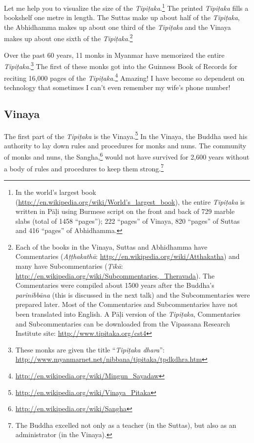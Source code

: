 \pagebreak

Let me help you to visualize the size of the \textit{Tipiṭaka}.\footnote{In the world’s largest book (\url{http://en.wikipedia.org/wiki/World’s_largest_book}), the entire \textit{Tipiṭaka} is written in Pāḷi using Burmese script on the front and back of 729 marble slabs (total of 1458 “pages”); 222 “pages” of Vinaya, 820 “pages” of Suttas and 416 “pages” of Abhidhamma.} The printed \textit{Tipiṭaka} fills a bookshelf one metre in length. The Suttas make up about half of the \textit{Tipiṭaka}, the Abhidhamma makes up about one third of the \textit{Tipiṭaka} and the Vinaya makes up about one sixth of the \textit{Tipiṭaka}.\footnote{Each of the books in the Vinaya, Suttas and Abhidhamma have Commentaries (\textit{Aṭṭhakathā}: \url{http://en.wikipedia.org/wiki/Atthakatha}) and many have Subcommentaries (\textit{Ṭīkā}: \url{http://en.wikipedia.org/wiki/Subcommentaries,_Theravada}). The Commentaries were compiled about 1500 years after the Buddha's \textit{parinibbāna} (this is discussed in the next talk) and the Subcommentaries were prepared later. Most of the Commentaries and Subcommentaries have not been translated into English. A Pāḷi version of the \textit{Tipiṭaka}, Commentaries and Subcommentaries can be downloaded from the Vipassana Research Institute site: \url{http://www.tipitaka.org/cst4}}

Over the past 60 years, 11 monks in Myanmar have memorized the entire \textit{Tipiṭaka}.\footnote{These monks are given the title “\textit{Tipiṭaka dhara}”: \url {http://www.myanmarnet.net/nibbana/tipitaka/tpdkdhra.htm}} The first of these monks got into the Guinness Book of Records for reciting 16,000 pages of the \textit{Tipiṭaka}.\footnote{\url{http://en.wikipedia.org/wiki/Mingun_Sayadaw}} Amazing! I have become so dependent on technology that sometimes I can’t even remember my wife’s phone number!

\subsection*{Vinaya}

The first part of the \textit{Tipiṭaka} is the Vinaya.\footnote{\url{http://en.wikipedia.org/wiki/Vinaya_Pitaka}} In the Vinaya, the Buddha used his authority to lay down rules and procedures for monks and nuns. The community of monks and nuns, the Sangha,\footnote{\url{http://en.wikipedia.org/wiki/Sangha}} would not have survived for 2,600 years without a body of rules and procedures to keep them strong.\footnote{The Buddha excelled not only as a teacher (in the Suttas), but also as an administrator (in the Vinaya).}

